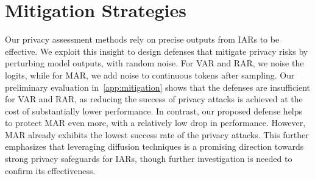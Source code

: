 \section{Mitigation Strategies}

Our privacy assessment methods rely on precise outputs from IARs to be effective. We exploit this insight to design defenses that mitigate privacy risks by perturbing model outputs, \eg with random noise. For VAR and RAR, we noise the logits, while for MAR, we add noise to continuous tokens after sampling. Our preliminary evaluation in~\cref{app:mitigation} shows that the defenses are insufficient for VAR and RAR, as reducing the success of privacy attacks is achieved at the cost of substantially lower performance. In contrast, our proposed defense helps to protect MAR even more, with a relatively low drop in performance. However, MAR already exhibits the lowest success rate of the privacy attacks. This further emphasizes that leveraging diffusion techniques is a promising direction towards strong privacy safeguards for IARs, though further investigation is needed to confirm its effectiveness.














